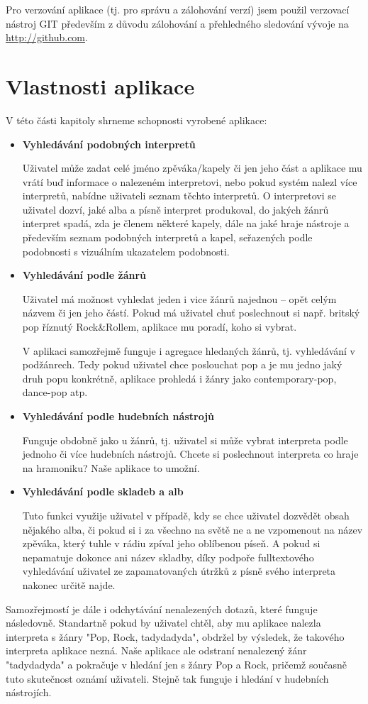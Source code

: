 Pro verzování aplikace (tj. pro správu a zálohování verzí) jsem použil verzovací nástroj GIT především z důvodu zálohování a přehledného sledování vývoje na \url{http://github.com}. 

\section{Vlastnosti aplikace}

V této části kapitoly shrneme schopnosti vyrobené aplikace:

\begin{itemize}
\item[] \textbf{Vyhledávání podobných interpretů}
    
    Uživatel může zadat celé jméno zpěváka/kapely či jen jeho část a aplikace mu vrátí buď informace o nalezeném interpretovi, nebo pokud systém nalezl více interpretů, nabídne uživateli seznam těchto interpretů. 
    O interpretovi se uživatel dozví, jaké alba a písně interpret produkoval, do jakých žánrů interpret spadá, zda je členem některé kapely, dále na jaké hraje nástroje a především seznam podobných interpretů a kapel, seřazených podle podobnosti s vizuálním ukazatelem podobnosti.
    
\item[] \textbf{Vyhledávání podle žánrů}
    
    Uživatel má možnost vyhledat jeden i vice žánrů najednou – opět celým názvem či jen jeho částí. Pokud má uživatel chuť poslechnout si např. britský pop říznutý Rock\&Rollem, aplikace mu poradí, koho si vybrat.
    
    V aplikaci samozřejmě funguje i agregace hledaných žánrů, tj. vyhledávání v podžánrech. Tedy pokud uživatel chce poslouchat pop a je mu jedno jaký druh popu konkrétně, aplikace prohledá i žánry jako contemporary-pop, dance-pop atp.

\item[] \textbf{Vyhledávání podle hudebních nástrojů}
    
    Funguje obdobně jako u žánrů, tj. uživatel si může vybrat interpreta podle jednoho či více hudebních nástrojů. Chcete si poslechnout interpreta co hraje na hramoniku? Naše aplikace to umožní.

\item[] \textbf{Vyhledávání podle skladeb a alb}
    
    Tuto funkci využije uživatel v případě, kdy se chce uživatel dozvědět obsah nějakého alba, či pokud si i za všechno na světě ne a ne vzpomenout na název zpěváka, který tuhle v rádiu zpíval jeho oblíbenou píseň. A pokud si nepamatuje dokonce ani název skladby, díky podpoře fulltextového vyhledávání uživatel ze zapamatovaných útržků z písně svého interpreta nakonec určitě najde.
\end{itemize}
Samozřejmostí je dále i odchytávání nenalezených dotazů, které funguje následovně.
Standartně pokud by uživatel chtěl, aby mu aplikace nalezla interpreta s žánry "Pop, Rock, tadydadyda", obdržel by výsledek, že takového interpreta aplikace nezná.
Naše aplikace ale odstraní nenalezený žánr "tadydadyda" a pokračuje v hledání jen s žánry Pop a Rock, pričemž současně tuto skutečnost oznámí uživateli.
Stejně tak funguje i hledání v hudebních nástrojích.

